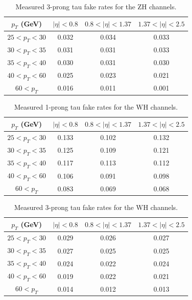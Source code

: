 \begin{table}[htb!]
    \centering
    \begin{tabular}{|c|c|c|c|}
    \hline
    $p_T$ (GeV) & $|\eta|<0.8$ & $0.8<|\eta|<1.37$ & $1.37<|\eta|<2.5$\\
    \hline
    $25<p_T<30$ & 0.032 & 0.034 & 0.033\\
    $30<p_T<35$ & 0.031 & 0.031 & 0.033\\
    $35<p_T<40$ & 0.030 & 0.031 & 0.030\\
    $40<p_T<60$ & 0.025 & 0.023 & 0.021\\
    $60<p_T$ & 0.016 & 0.011 & 0.001\\
    \hline
    \end{tabular}
    \caption{Measured 3-prong tau fake rates for the ZH channels.}
    \label{tab:zh_3p_tau_frs}
\end{table}

\begin{table}[htb!]
    \centering
    \begin{tabular}{|c|c|c|c|}
    \hline
    $p_T$ (GeV) & $|\eta|<0.8$ & $0.8<|\eta|<1.37$ & $1.37<|\eta|<2.5$\\
    \hline
    $25<p_T<30$ & 0.133 & 0.102 & 0.132\\
    $30<p_T<35$ & 0.125 & 0.109 & 0.121\\
    $35<p_T<40$ & 0.117 & 0.113 & 0.112\\
    $40<p_T<60$ & 0.106 & 0.091 & 0.098\\
    $60<p_T$ & 0.083 & 0.069 & 0.068\\
    \hline
    \end{tabular}
    \caption{Measured 1-prong tau fake rates for the WH channels.}
    \label{tab:wh_1p_tau_frs}
\end{table}

\begin{table}[htb!]
    \centering
    \begin{tabular}{|c|c|c|c|}
    \hline
    $p_T$ (GeV) & $|\eta|<0.8$ & $0.8<|\eta|<1.37$ & $1.37<|\eta|<2.5$\\
    \hline
    $25<p_T<30$ & 0.029 & 0.026 & 0.027\\
    $30<p_T<35$ & 0.027 & 0.025 & 0.025\\
    $35<p_T<40$ & 0.024 & 0.022 & 0.024\\
    $40<p_T<60$ & 0.019 & 0.022 & 0.021\\
    $60<p_T$ & 0.014 & 0.012 & 0.013\\
    \hline
    \end{tabular}
    \caption{Measured 3-prong tau fake rates for the WH channels.}
    \label{tab:wh_3p_tau_frs}
\end{table}

